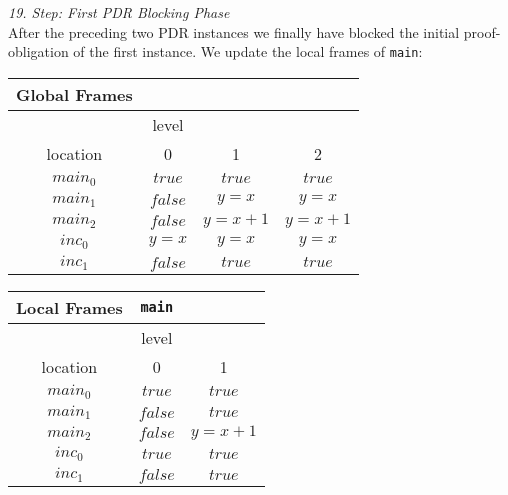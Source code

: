 \documentclass{article}
\begin{document}
\vspace*{2em}

\textsl{19. Step: First PDR Blocking Phase} \\
After the preceding two PDR instances we finally have blocked the initial proof-obligation of the first instance. We update the local frames of \texttt{main}: \\

\begin{minipage}{.5\textwidth}
	\setlength\tabcolsep{0.35em}
		\begin{center}
			\begin{tabu}{cccc}
				Global Frames \\
				\toprule
				& level \\
				\cmidrule(lr){2-4}
				location & 0 & 1 & 2 \\
				$main_0$ & $true$ & $true$ & $true$  \\
				$main_1$ & $false$ & $y = x$ & $y = x$\\
				$main_2$ & $false$ & $y = x + 1$ & $y = x + 1$ \\
				$inc_0$ & $y = x$ & $y = x$ & $y = x$ \\
				$inc_1$ & $false$ & $true$ & $true$\\
				\bottomrule
			\end{tabu}
		\end{center}
\end{minipage}
\hfill
\begin{minipage}{.4\textwidth}
	\setlength\tabcolsep{0.35em}
		\begin{center}
			\begin{tabu}{ccc}
				Local Frames & \texttt{main}\\
				\toprule
				& level \\
				\cmidrule(lr){2-3}
				location & 0 & 1 \\
				\cmidrule{1-3}
				$main_0$ & $true$ & $true$ \\
				$main_1$ & $false$ & $true$\\
				$main_2$ & $false$ & $y = x + 1$\\
				$inc_0$ & $true$ & $true$\\
				$inc_1$ & $false$ & $true$\\
				\bottomrule
			\end{tabu}
		\end{center}	
\end{minipage}

\vspace*{2em}
\end{document}
